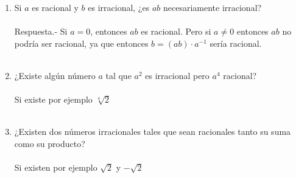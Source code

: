 \begin{enumerate}
\begin{enumerate}[\bfseries (a)]
	 \item Si $a$ es racional y \; $b$ es irracional, ¿es $ab$ necesariamente irracional?\\\\
	 Respuesta.- \; Si $a=0$, entonces $ab$ es racional. Pero si $a\neq 0$ entonces $ab$ no podría ser racional, ya que entonces $b=(ab) \cdot a^{-1}$ sería racional.\\\\     

	 \item ¿Existe algún número $a$ tal que $a^2$ es irracional pero $a^4$ racional?\\\\
	 Si existe por ejemplo $\sqrt[4]{2}$\\\\

	 \item ¿Existen dos números irracionales tales que sean racionales tanto su suma como su producto?\\\\
	 Si existen por ejemplo $\sqrt{2}$ y $- \sqrt{2}$\\\\
      \end{enumerate}


\end{enumerate}
